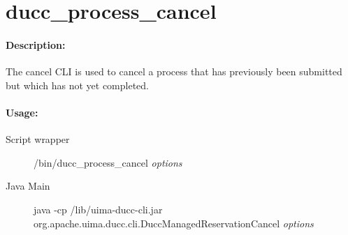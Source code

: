 % 
% 
% 
% 
\ifpdf
\else
{}
\fi
    \section{ducc\_process\_cancel}

    \paragraph{Description:}
    The cancel CLI is used to cancel a process that has previously been submitted but which has not yet 
    completed. 

    \paragraph{Usage:}
    \begin{description}
    \item[Script wrapper] \ducchome/bin/ducc\_process\_cancel {\em options}
    \item[Java Main]      java -cp \ducchome/lib/uima-ducc-cli.jar\\org.apache.uima.ducc.cli.DuccManagedReservationCancel {\em options}
    \end{description}

